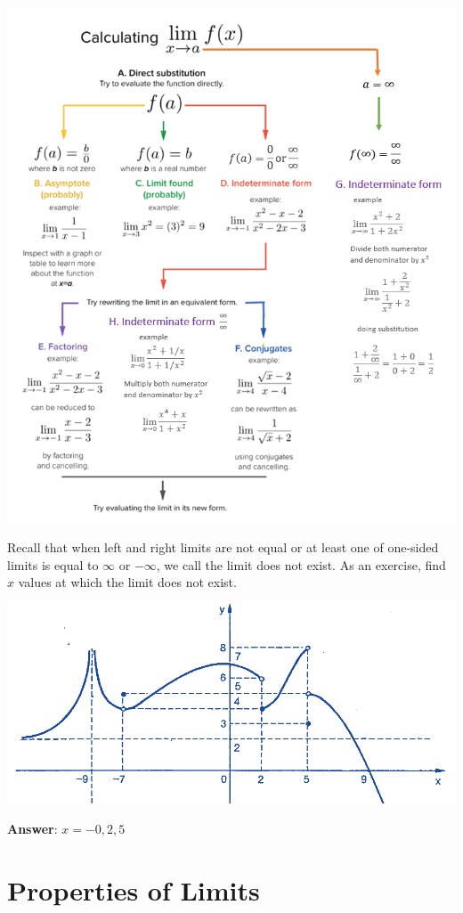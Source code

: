 \documentclass[
]{book}
\begin{document}
\begin{center}\includegraphics[width=0.85\linewidth]{img02/w01-CalculateLimit} \end{center}

\hfill\break

Recall that when left and right limits are not equal or at least one of one-sided limits is equal to \(\infty\) or \(-\infty\), we call the limit does not exist. As an exercise, find \(x\) values at which the limit does not exist.

\begin{center}\includegraphics[width=0.75\linewidth]{img02/w02note-limitDoesNotExist} \end{center}

\textbf{Answer}: \(x = -0, 2, 5\)

\hfill\break

\hypertarget{properties-of-limits-1}{%
\section{Properties of Limits}\label{properties-of-limits-1}}
\end{document}
